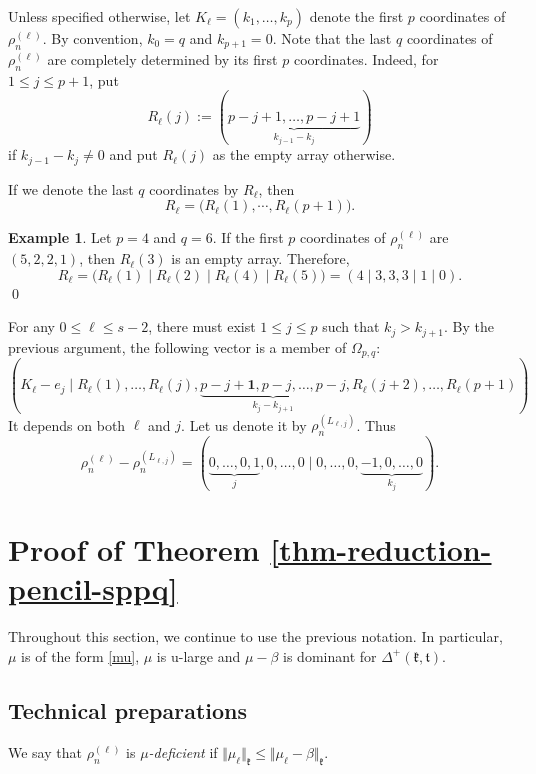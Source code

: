 \documentclass[11pt]{amsart}
\theoremstyle{plain}
\theoremstyle{definition}
\newtheorem{example}[thm]{Example}
\newcommand{\frk}{\mathfrak{k}}
\newcommand{\frt}{\mathfrak{t}}
\begin{document}
Unless specified otherwise, let $K_\ell=(k_1, \dots, k_p)$ denote the first $p$ coordinates of $\rho_n^{(\ell)}$. By convention, $k_0=q$ and $k_{p+1}=0$. Note that the last $q$ coordinates of $\rho_n^{(\ell)}$ are completely determined by its first $p$ coordinates. Indeed, for $1\le j\le p+1$, put
$$
R_\ell(j):=(\underbrace{p-j+1,\dots,p-j+1}_{k_{j-1}-k_j})
$$
if $k_{j-1}-k_j\neq 0$ and put $R_\ell(j)$ as the empty array otherwise.

If we denote the last $q$ coordinates by $R_\ell$, then
\[R_\ell=\big(R_\ell(1),\cdots,R_\ell(p+1)\big).\]

\begin{example}\label{example-R}
	Let $p=4$ and $q=6$. If the first $p$ coordinates of $\rho_n^{(\ell)}$ are $(5,2,2,1)$, then $R_\ell(3)$ is an empty array. Therefore,
		\[R_\ell=\big(R_\ell(1)\mid R_\ell(2)\mid R_\ell(4)\mid R_\ell(5)\big)=(4\mid3,3,3\mid1\mid0).\]\hfill\qed
\end{example}

For any $0\leq \ell \leq s-2$, there must exist $1\le j\le p$ such that $k_{j}>k_{j+1}$. By the previous argument, the following vector is a member of $\Omega_{p, q}$:
$$
(K_\ell-e_{j}\mid R_\ell(1), \dots, R_\ell(j), \underbrace{p-j+\textbf{1}, p-j, \dots, p-j}_{k_{j}-k_{j+1}}, R_\ell(j+2), \dots, R_\ell(p+1))
$$
It  depends on both $\ell$ and $j$. Let us denote it by $\rho_n^{(L_{\ell,j})}$.%
Thus
\begin{equation}\label{eq5}
\rho_n^{(\ell)}-\rho_n^{(L_{\ell, j})}=(\underbrace{0,\dots,0,1}_{j},0,\dots,0\mid 0,\dots,0,\underbrace{-1,0,\dots,0}_{k_{j}}).\end{equation}





\section{Proof of Theorem \ref{thm-reduction-pencil-sppq}}\label{sec-proof}
Throughout this section, we continue to use the previous notation.
In particular, $\mu$ is of the form \eqref{mu}, $\mu$ is u-large and $\mu-\beta$ is dominant for $\Delta^+(\frk, \frt)$.

\subsection{Technical preparations}
We say that $\rho_n^{(\ell)}$ is \emph{$\mu$-deficient} if $\Vert\mu_\ell\Vert_\frk\le \Vert\mu_\ell-\beta\Vert_\frk$.
\end{document}
